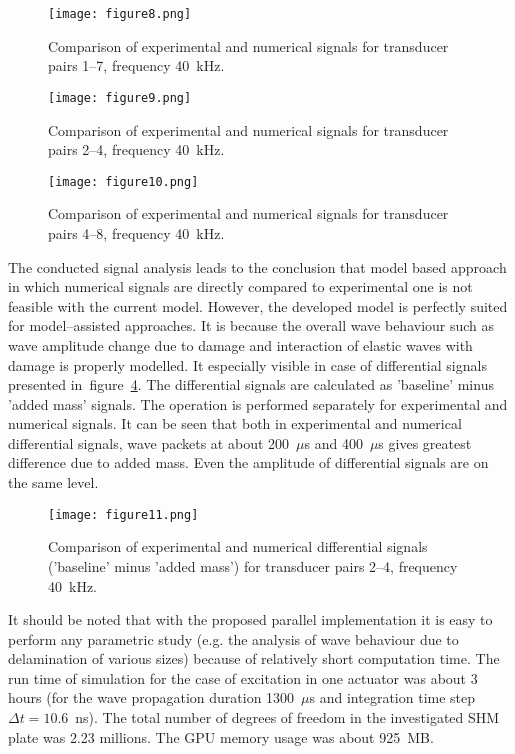 \documentclass[12pt]{iopart}
\begin{document}
\begin{figure} [h!]
	\centering
	\texttt{[image: figure8.png]}	
	\caption{Comparison of experimental and numerical signals for transducer pairs 1--7, frequency 40~kHz.}
	\label{fig:path1_7}
\end{figure}
\begin{figure} [h!]
	\centering
	\texttt{[image: figure9.png]}	
	\caption{Comparison of experimental and numerical signals for transducer pairs 2--4, frequency 40~kHz.}
	\label{fig:path2_4}
\end{figure}
\begin{figure} [h!]
	\centering
	\texttt{[image: figure10.png]}	
	\caption{Comparison of experimental and numerical signals for transducer pairs 4--8, frequency 40~kHz.}
	\label{fig:path4_8}
\end{figure}
\clearpage
The conducted signal analysis leads to the conclusion that model based approach in which numerical signals are directly compared to experimental one is not feasible with the current model. However, the developed model is perfectly suited for model--assisted approaches. It is because the overall wave behaviour such as wave amplitude change due to damage and interaction of elastic waves with damage is properly modelled. It especially visible in case of differential signals presented in~figure~\ref{fig:path2_4_diff}. The differential signals are calculated as 'baseline' minus 'added mass' signals. The operation is performed separately for experimental and numerical signals. It can be seen that both in experimental and numerical differential signals, wave packets at about 200~$\mu$s and 400~$\mu$s gives greatest difference due to added mass. Even the amplitude of differential signals are on the same level.

\begin{figure} [h!]
	\centering
	\texttt{[image: figure11.png]}	
	\caption{Comparison of experimental and numerical differential signals ('baseline' minus 'added mass') for transducer pairs 2--4, frequency 40~kHz.}
	\label{fig:path2_4_diff}
\end{figure}

It should be noted that with the proposed parallel implementation it is easy to perform any parametric study (e.g. the analysis of wave behaviour due to delamination of various sizes) because of relatively short computation time. The run time of simulation for the case of excitation in one actuator was about 3 hours (for the wave propagation duration 1300~$\mu$s and integration time step $\Delta t = 10.6$~ns). The total number of degrees of freedom in the investigated SHM plate was 2.23 millions. The GPU memory usage was about 925~MB.
\end{document}
